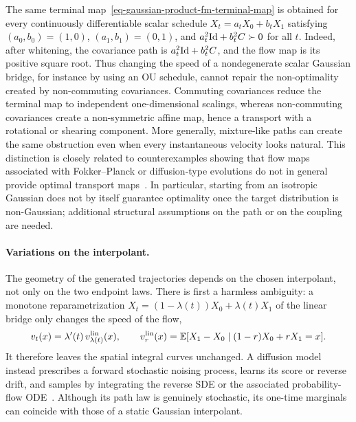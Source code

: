 \begin{rem}
	The same terminal map~\eqref{eq-gaussian-product-fm-terminal-map} is obtained for every continuously differentiable scalar schedule $X_t=a_tX_0+b_tX_1$ satisfying $(a_0,b_0)=(1,0)$, $(a_1,b_1)=(0,1)$, and $a_t^2\mathrm{Id}+b_t^2C\succ0$ for all $t$. Indeed, after whitening, the covariance path is $a_t^2\mathrm{Id}+b_t^2C$, and the flow map is its positive square root. Thus changing the speed of a nondegenerate scalar Gaussian bridge, for instance by using an OU schedule, cannot repair the non-optimality created by non-commuting covariances.
	Commuting covariances reduce the terminal map to independent one-dimensional scalings, whereas non-commuting covariances create a non-symmetric affine map, hence a transport with a rotational or shearing component. More generally, mixture-like paths can create the same obstruction even when every instantaneous velocity looks natural. This distinction is closely related to counterexamples showing that flow maps associated with Fokker--Planck or diffusion-type evolutions do not in general provide optimal transport maps~\cite{LavenantSantambrogio2022FlowMap}. In particular, starting from an isotropic Gaussian does not by itself guarantee optimality once the target distribution is non-Gaussian; additional structural assumptions on the path or on the coupling are needed.
\end{rem}

\paragraph{Variations on the interpolant.}

The geometry of the generated trajectories depends on the chosen interpolant, not only on the two endpoint laws. There is first a harmless ambiguity: a monotone reparametrization $X_t=(1-\lambda(t))X_0+\lambda(t)X_1$ of the linear bridge only changes the speed of the flow,
\[
	v_t(x)=\lambda'(t)\,v^{\rm lin}_{\lambda(t)}(x),
	\qquad
	v^{\rm lin}_{r}(x)=\mathbb{E}[X_1-X_0\mid (1-r)X_0+rX_1=x].
\]
It therefore leaves the spatial integral curves unchanged. A diffusion model instead prescribes a forward stochastic noising process, learns its score or reverse drift, and samples by integrating the reverse SDE or the associated probability-flow ODE~\cite{Song2021ScoreSDE}. Although its path law is genuinely stochastic, its one-time marginals can coincide with those of a static Gaussian interpolant.

